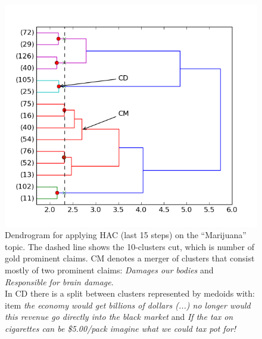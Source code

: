 \begin{figure}[h]
\begin{center}
\includegraphics{dendrogram.png}
\end{center}
\caption{Dendrogram for applying HAC (last 15 steps) on the ``Marijuana'' topic.
The dashed line shows the 10-clusters cut, which is number of gold prominent
claims.
CM denotes a merger of clusters that consist mostly of two prominent claims: 
\textit{Damages our bodies} and \textit{Responsible for brain damage}.  \\
In CD there is a split between clusters represented by medoids with: 
item \textit{the economy would get billions of dollars (...) no longer would this revenue
go directly into the black market} and 
\textit{If the tax on cigarettes can
be \$5.00/pack imagine what we could tax pot for!}
}
\label{fig:dendrogram}
\end{figure}

